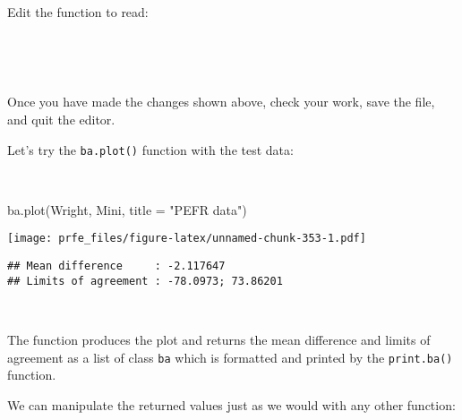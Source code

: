\documentclass[
  12pt,
  a4paper]{book}
\newenvironment{Shaded}{\begin{snugshade}}{\end{snugshade}}
\newcommand{\AttributeTok}[1]{\textcolor[rgb]{0.77,0.63,0.00}{#1}}
\newcommand{\ControlFlowTok}[1]{\textcolor[rgb]{0.13,0.29,0.53}{\textbf{#1}}}
\newcommand{\DecValTok}[1]{\textcolor[rgb]{0.00,0.00,0.81}{#1}}
\newcommand{\FunctionTok}[1]{\textcolor[rgb]{0.00,0.00,0.00}{#1}}
\newcommand{\NormalTok}[1]{#1}
\newcommand{\OtherTok}[1]{\textcolor[rgb]{0.56,0.35,0.01}{#1}}
\newcommand{\SpecialCharTok}[1]{\textcolor[rgb]{0.00,0.00,0.00}{#1}}
\newcommand{\StringTok}[1]{\textcolor[rgb]{0.31,0.60,0.02}{#1}}
\begin{document}
~

Edit the function to read:

~

\begin{Shaded}
\end{Shaded}

~

Once you have made the changes shown above, check your work, save the file, and quit the editor.

Let's try the \texttt{ba.plot()} function with the test data:

~

\begin{Shaded}
\begin{Highlighting}[]
\FunctionTok{ba.plot}\NormalTok{(Wright, Mini, }\AttributeTok{title =} \StringTok{"PEFR data"}\NormalTok{)}
\end{Highlighting}
\end{Shaded}

\texttt{[image: prfe\_files/figure-latex/unnamed-chunk-353-1.pdf]}

\begin{verbatim}
## Mean difference     : -2.117647
## Limits of agreement : -78.0973; 73.86201
\end{verbatim}

~

The function produces the plot and returns the mean difference and limits of agreement as a list of class \texttt{ba} which is formatted and printed by the \texttt{print.ba()} function.

We can manipulate the returned values just as we would with any other function:

~

\begin{Shaded}
\end{Shaded}
\end{document}

